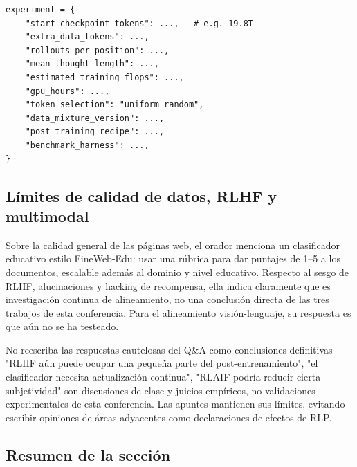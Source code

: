 \documentclass[a4paper]{article}
\begin{document}


\begin{lstlisting}[caption={Tabla mínima de experimento recomendada para evaluar RLP}]
experiment = {
    "start_checkpoint_tokens": ...,   # e.g. 19.8T
    "extra_data_tokens": ...,
    "rollouts_per_position": ...,
    "mean_thought_length": ...,
    "estimated_training_flops": ...,
    "gpu_hours": ...,
    "token_selection": "uniform_random",
    "data_mixture_version": ...,
    "post_training_recipe": ...,
    "benchmark_harness": ...,
}
\end{lstlisting}

\subsection{Límites de calidad de datos, RLHF y multimodal}

Sobre la calidad general de las páginas web, el orador menciona un clasificador educativo estilo FineWeb-Edu: usar una rúbrica para dar puntajes de 1--5 a los documentos, escalable además al dominio y nivel educativo. Respecto al sesgo de RLHF, alucinaciones y hacking de recompensa, ella indica claramente que es investigación continua de alineamiento, no una conclusión directa de las tres trabajos de esta conferencia. Para el alineamiento visión-lenguaje, su respuesta es que aún no se ha testeado.

\begin{warningbox}{No reescriba las respuestas cautelosas del Q\&A como conclusiones definitivas}
"RLHF aún puede ocupar una pequeña parte del post-entrenamiento", "el clasificador necesita actualización continua", "RLAIF podría reducir cierta subjetividad" son discusiones de clase y juicios empíricos, no validaciones experimentales de esta conferencia. Las apuntes mantienen sus límites, evitando escribir opiniones de áreas adyacentes como declaraciones de efectos de RLP.
\end{warningbox}

\subsection{Resumen de la sección}
\end{document}
